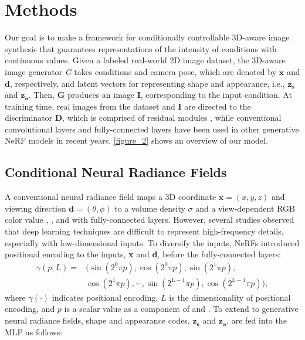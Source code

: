 \documentclass[nohyperref]{article}
\theoremstyle{plain}
\theoremstyle{definition}
\theoremstyle{remark}
\begin{document}
\section{Methods}
\label{methods}
Our goal is to make a framework for conditionally controllable 3D-aware image synthesis that guarantees representations of the intensity of conditions with continuous values. Given a labeled real-world 2D image dataset, the 3D-aware image generator \textit{G} takes conditions and camera pose, which are denoted by $\textbf{x}$ and $\textbf{d}$, respectively, and latent vectors for representing shape and appearance, i.e., $\textbf{z}_{\textbf{s}}$ and $\textbf{z}_{\textbf{a}}$. Then, \textbf{G} produces an image \textbf{I}, corresponding to the input condition. At training time, real images from the dataset and \textbf{I} are directed to the discriminator \textbf{D}, which is comprised of residual modules \cite{he2016deep}, while conventional convolutional layers \cite{o2015introduction} and fully-connected layers \cite{pinkus1999approximation} have been used in other generative NeRF models in recent years. \cref{figure_2} shows an overview of our model.


\subsection{Conditional Neural Radiance Fields} A conventional neural radiance field maps a 3D coordinate $\textbf{x} = (x, y, z)$ and viewing direction $\textbf{d} = (\theta, \phi)$ to a volume density $\sigma$ and a view-dependent RGB color value , , and  with fully-connected layers. However, several studies \cite{rahaman2019spectral} observed that deep learning techniques are difficult to represent high-frequency details, especially with low-dimensional inputs. To diversify the inputs, NeRFs introduced positional encoding \cite{tancik2020fourier} to the inputs, \textbf{x} and \textbf{d}, before the fully-connected layers:
\begin{align}
    \gamma(p, L) = &(\sin(2^{0}\pi p), \cos(2^{0}\pi p), \sin(2^{1}\pi p),\\ \nonumber &\cos(2^{1}\pi p), \cdots, \sin(2^{\text{L}-1}\pi p), \cos(2^{\text{L}-1}\pi p)),
\end{align}
where $\gamma(\cdot)$ indicates positional encoding, $L$ is the dimensionality of positional encoding, and $p$ is a scalar value as a component of  and . To extend to generative neural radiance fields, shape and appearance codes, $\textbf{z}_{\textbf{s}}$ and $\textbf{z}_{\textbf{a}}$, are fed into the MLP as follows:
\end{document}
